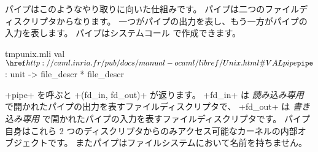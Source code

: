 パイプはこのようなやり取りに向いた仕組みです。
パイプは二つのファイルディスクリプタからなります。
一つがパイプの出力を表し、もう一方がパイプの入力を表します。
パイプはシステムコール  で作成できます。
%
\begin{listingcodefile}{tmpunix.mli}
val $\libvalue{Unix}{pipe}$ : unit -> file_descr * file_descr
\end{listingcodefile}
%
\ml+pipe+ を呼ぶと \ml+(fd_in, fd_out)+ が返ります。
\ml+fd_in+ は \emph{読み込み専用} で開かれたパイプの出力を表すファイルディスクリプタで、
\ml+fd_out+ は \emph{書き込み専用} で開かれたパイプの入力を表すファイルディスクリプタです。
パイプ自身はこれら 2 つのディスクリプタからのみアクセス可能なカーネルの内部オブジェクトです。
またパイプはファイルシステムにおいて名前を持ちません。



\begin{myimage}[width="60\%"]
\end{myimage}

